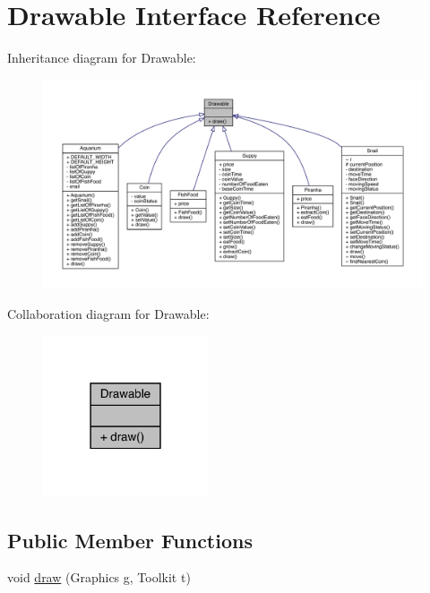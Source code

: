\hypertarget{interface_drawable}{}\section{Drawable Interface Reference}
\label{interface_drawable}


Inheritance diagram for Drawable\+:
\nopagebreak
\begin{figure}[H]
\begin{center}
\leavevmode
\includegraphics[width=350pt]{interface_drawable__inherit__graph}
\end{center}
\end{figure}


Collaboration diagram for Drawable\+:
\nopagebreak
\begin{figure}[H]
\begin{center}
\leavevmode
\includegraphics[width=138pt]{interface_drawable__coll__graph}
\end{center}
\end{figure}
\subsection*{Public Member Functions}
\begin{DoxyCompactItemize}
\item 
void \mbox{\hyperlink{interface_drawable_aaddafb212b3c8e60fcc742052570c893}{draw}} (Graphics g, Toolkit t)
\end{DoxyCompactItemize}


